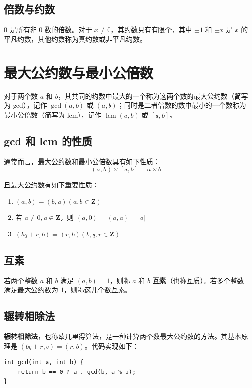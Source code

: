 \subsection{倍数与约数}

$0$ 是所有非 $0$ 数的倍数。对于 $x \neq 0$，其约数只有有限个，其中 $\pm 1$ 和 $\pm x$ 是 $x$ 的平凡约数，其他约数称为真约数或非平凡约数。

\section{最大公约数与最小公倍数}

对于两个数 $a$ 和 $b$，其共同的约数中最大的一个称为这两个数的最大公约数（简写为 gcd），记作 $\gcd(a, b)$ 或 $(a,b)$；同时是二者倍数的数中最小的一个数称为最小公倍数（简写为 lcm），记作 $\operatorname{lcm}(a, b)$ 或 $[a, b]$。

\subsection{gcd 和 lcm 的性质}

通常而言，最大公约数和最小公倍数具有如下性质：
\[
(a, b) \times [a, b] = a \times b
\]

且最大公约数有如下重要性质：

\begin{enumerate}
\item $(a, b) = (b, a) (a, b \in \mathbf{Z})$
\item 若 $a \neq 0, a \in \mathbf{Z} $，则 $(a, 0) = (a, a) = \lvert a \rvert$
\item $(bq+r, b) = (r, b) (b,q, r \in \mathbf{Z})$
\end{enumerate}

\subsection{互素}

若两个整数 $a$ 和 $b$ 满足 $(a, b) = 1$，则称 $a$ 和 $b$ \textbf{互素}（也称互质）。若多个整数满足最大公约数为 $1$，则称这几个数互素。

\subsection{辗转相除法}

\textbf{辗转相除法}，也称欧几里得算法，是一种计算两个数最大公约数的方法。其基本原理是 $(bq+r, b) = (r, b)$。代码实现如下：

\begin{lstlisting}[caption=辗转相除法]
int gcd(int a, int b) {
    return b == 0 ? a : gcd(b, a % b);
}
\end{lstlisting}

